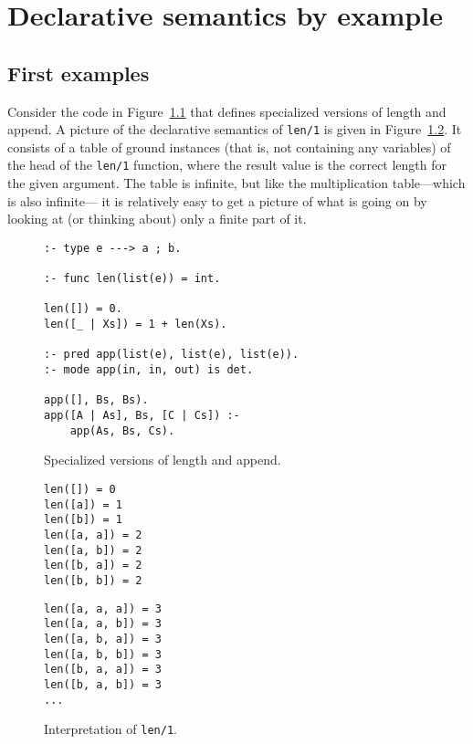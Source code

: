 \chapter{Declarative semantics by example}
\label{sec:by-example}

\section{First examples}
\label{sec:first-examples}

Consider the code in Figure~\ref{fig:len-app}
that defines specialized versions of length and append.
A picture of the declarative semantics of \texttt{len/1}
is given in Figure~\ref{fig:len-interp}.
It consists of a table of ground instances
(that is, not containing any variables)
of the head of the \texttt{len/1} function,
where the result value is the correct length for the given argument.
The table is infinite,
but like the multiplication table---which is also infinite---%
it is relatively easy to get a picture of what is going on
by looking at (or thinking about) only a finite part of it.

\begin{figure}
\begin{verbatim}
:- type e ---> a ; b.

:- func len(list(e)) = int.

len([]) = 0.
len([_ | Xs]) = 1 + len(Xs).

:- pred app(list(e), list(e), list(e)).
:- mode app(in, in, out) is det.

app([], Bs, Bs).
app([A | As], Bs, [C | Cs]) :-
    app(As, Bs, Cs).
\end{verbatim}
\caption{Specialized versions of length and append.\label{fig:len-app}}
\end{figure}

\begin{figure}
\begin{minipage}{0.5\textwidth}
\begin{verbatim}
len([]) = 0
len([a]) = 1
len([b]) = 1
len([a, a]) = 2
len([a, b]) = 2
len([b, a]) = 2
len([b, b]) = 2
\end{verbatim}
\end{minipage}%
\begin{minipage}{0.5\textwidth}
\begin{verbatim}
len([a, a, a]) = 3
len([a, a, b]) = 3
len([a, b, a]) = 3
len([a, b, b]) = 3
len([b, a, a]) = 3
len([b, a, b]) = 3
...
\end{verbatim}
\end{minipage}
\caption{Interpretation of \texttt{len/1}.
\label{fig:len-interp}}
\end{figure}

